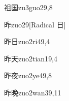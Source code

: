 \begin{verbete}{祖国}{zu3guo2}{9,8}
\end{verbete}

\begin{verbete}{昨}{zuo2}{9}[Radical 日]
\end{verbete}

\begin{verbete}{昨日}{zuo2ri4}{9,4}
\end{verbete}

\begin{verbete}{昨天}{zuo2tian1}{9,4}
\end{verbete}

\begin{verbete}{昨夜}{zuo2ye4}{9,8}
\end{verbete}

\begin{verbete}{昨晚}{zuo2wan3}{9,11}
\end{verbete}


